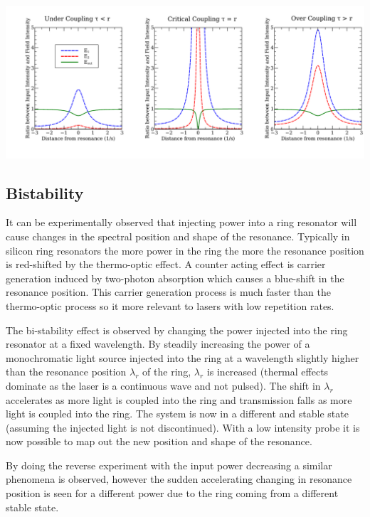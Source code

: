 \begingroup
    \centering  
    \includegraphics[width=18cm]{img/theory/coupling.pdf}
     \vspace{3pt} \label{crossCompare}
\endgroup

\subsection{Bistability}
It can be experimentally observed that injecting power into a ring resonator will cause changes in the spectral position and shape of the resonance. Typically in silicon ring resonators the more power in the ring the more the resonance position is red-shifted by the thermo-optic effect\cite{almeida_optical_2004-1}. A counter acting effect is carrier generation induced by two-photon absorption \cite{xu_carrier-induced_2006} which causes a blue-shift in the resonance position. This carrier generation process is much faster than the thermo-optic process so it more relevant to lasers with low repetition rates. 

The bi-stability effect is observed by changing the power injected into the ring resonator at a fixed wavelength. By steadily increasing the power of a monochromatic light source injected into the ring at a wavelength slightly higher than the resonance position $\lambda_{r}$ of the ring, $\lambda_{r}$ is increased (thermal effects dominate as the laser is a continuous wave and not pulsed). The shift in $\lambda_{r}$ accelerates as more light is coupled into the ring and transmission falls as more light is coupled into the ring. The system is now in a different and stable state (assuming the injected light is not discontinued). With a low intensity probe it is now possible to map out the new position and shape of the resonance.

By doing the reverse experiment with the input power decreasing a similar phenomena is observed, however the sudden accelerating changing in resonance position is seen for a different power due to the ring coming from a different stable state. 

